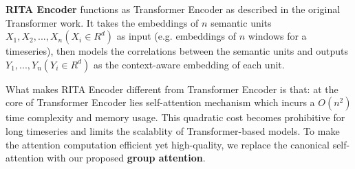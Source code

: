 \begin{sloppypar}



\noindent\textbf{RITA Encoder} functions as Transformer Encoder as described in the original Transformer work\cite{DBLP:conf/nips/VaswaniSPUJGKP17}. It takes the embeddings of $n$ semantic units $X_1,X_2,...,X_n (X_i \in R^d)$ as input (e.g. embeddings of $n$ windows for a timeseries), then models the correlations between the semantic units and outputs $Y_1,...,Y_n (Y_i \in R^d)$ as the context-aware embedding of each unit. %

What makes RITA Encoder different from Transformer Encoder is that: at the core of Transformer Encoder lies self-attention mechanism which incurs a $O(n^2)$ time complexity and memory usage. This quadratic cost becomes prohibitive for long timeseries and limits the scalablity of Transformer-based models. To make the attention computation efficient yet high-quality, we replace the canonical self-attention with our proposed {\bf group attention}.


\end{sloppypar}
